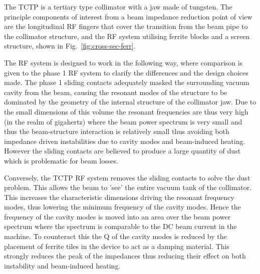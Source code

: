 The TCTP is a tertiary type collimator with a jaw made of tungsten. The principle components of interest from a beam impedance reduction point of view are the longitudinal RF fingers that cover the transition from the beam pipe to the collimator structure, and the RF system utilising ferrite blocks and a screen structure, shown in Fig.~\ref{fig:cross-sec-ferr}.

The RF system is designed to work in the following way, where comparison is given to the phase 1 RF system to clarify the differences and the design choices made. The phase 1 sliding contacts adequately masked the surrounding vacuum cavity from the beam, causing the resonant modes of the structure to be dominated by the geometry of the internal structure of the collimator jaw. Due to the small dimensions of this volume the resonant frequencies are thus very high (in the realm of gigahertz) where the beam power spectrum is very small and thus the beam-structure interaction is relatively small thus avoiding both impedance driven instabilities due to cavity modes and beam-induced heating. However the sliding contacts are believed to produce a large quantity of dust which is problematic for beam losses.

Conversely, the TCTP RF system removes the sliding contacts to solve the dust problem. This allows the beam to 'see' the entire vacuum tank of the collimator. This increases the characteristic dimensions driving the resonant frequency modes, thus lowering the minimum frequency of the cavity modes. Hence the frequency of the cavity modes is moved into an area over the beam power spectrum where the spectrum is comparable to the DC beam current in the machine. To counteract this the Q of the cavity modes is reduced by the placement of ferrite tiles in the device to act as a damping material. This strongly reduces the peak of the impedances thus reducing their effect on both instability and beam-induced heating.